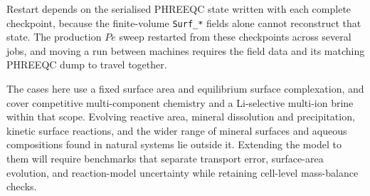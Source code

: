 Restart depends on the serialised PHREEQC state written with each complete
checkpoint, because the finite-volume \texttt{Surf\_*} fields alone cannot
reconstruct that state. The production $Pe$ sweep restarted from these
checkpoints across several jobs, and moving a run between machines requires the
field data and its matching PHREEQC dump to travel together.

The cases here use a fixed surface area and equilibrium surface complexation,
and cover competitive multi-component chemistry and a Li-selective multi-ion
brine within that scope. Evolving reactive area, mineral dissolution and
precipitation, kinetic surface reactions, and the wider range of mineral
surfaces and aqueous compositions found in natural systems lie outside it.
Extending the model to them will require benchmarks that separate transport
error, surface-area evolution, and reaction-model uncertainty while retaining
cell-level mass-balance checks.
